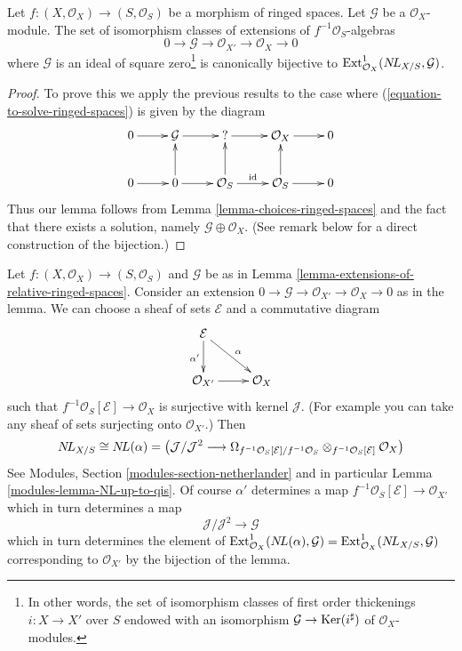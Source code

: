 \begin{lemma}
\label{lemma-extensions-of-relative-ringed-spaces}
Let $f : (X, \mathcal{O}_X) \to (S, \mathcal{O}_S)$ be a morphism of
ringed spaces. Let $\mathcal{G}$ be a $\mathcal{O}_X$-module.
The set of isomorphism classes of extensions of
$f^{-1}\mathcal{O}_S$-algebras
$$
0 \to \mathcal{G} \to \mathcal{O}_{X'} \to \mathcal{O}_X \to 0
$$
where $\mathcal{G}$ is an ideal of square zero\footnote{In other words,
the set of isomorphism classes of first order thickenings
$i : X \to X'$ over $S$ endowed with an isomorphism
$\mathcal{G} \to \mathop{\mathrm{Ker}}(i^\sharp)$ of $\mathcal{O}_X$-modules.} 
is canonically bijective to
$\mathop{\mathrm{Ext}}\nolimits^1_{\mathcal{O}_X}(\mathop{N\!L}\nolimits_{X/S}, \mathcal{G})$.
\end{lemma}

\begin{proof}
To prove this we apply the previous results to the case where
(\ref{equation-to-solve-ringed-spaces}) is given by the diagram
$$
\xymatrix{
0 \ar[r] &
\mathcal{G} \ar[r] &
{?} \ar[r] &
\mathcal{O}_X \ar[r] & 0 \\
0 \ar[r] &
0 \ar[u] \ar[r] &
\mathcal{O}_S \ar[u] \ar[r]^{\text{id}} &
\mathcal{O}_S \ar[u] \ar[r] & 0
}
$$
Thus our lemma follows from Lemma \ref{lemma-choices-ringed-spaces}
and the fact that there exists a solution, namely
$\mathcal{G} \oplus \mathcal{O}_X$.
(See remark below for a direct construction of the bijection.)
\end{proof}

\begin{remark}
\label{remark-extensions-of-relative-ringed-spaces}
Let $f : (X, \mathcal{O}_X) \to (S, \mathcal{O}_S)$ and $\mathcal{G}$
be as in Lemma \ref{lemma-extensions-of-relative-ringed-spaces}.
Consider an extension
$0 \to \mathcal{G} \to \mathcal{O}_{X'} \to \mathcal{O}_X \to 0$
as in the lemma. We can choose a sheaf of sets $\mathcal{E}$
and a commutative diagram
$$
\xymatrix{
\mathcal{E} \ar[d]_{\alpha'} \ar[rd]^\alpha \\
\mathcal{O}_{X'} \ar[r] & \mathcal{O}_X
}
$$
such that $f^{-1}\mathcal{O}_S[\mathcal{E}] \to \mathcal{O}_X$
is surjective with kernel $\mathcal{J}$.
(For example you can take any sheaf of sets surjecting
onto $\mathcal{O}_{X'}$.) Then
$$
\mathop{N\!L}\nolimits_{X/S} \cong \mathop{N\!L}\nolimits(\alpha) = 
\left(
\mathcal{J}/\mathcal{J}^2
\longrightarrow
\Omega_{f^{-1}\mathcal{O}_S[\mathcal{E}]/f^{-1}\mathcal{O}_S}
\otimes_{f^{-1}\mathcal{O}_S[\mathcal{E}]} \mathcal{O}_X\right)
$$
See Modules, Section \ref{modules-section-netherlander} and in particular
Lemma \ref{modules-lemma-NL-up-to-qis}. Of course $\alpha'$ determines a map
$f^{-1}\mathcal{O}_S[\mathcal{E}] \to \mathcal{O}_{X'}$
which in turn determines a map
$$
\mathcal{J}/\mathcal{J}^2 \longrightarrow \mathcal{G}
$$
which in turn determines the element of
$\mathop{\mathrm{Ext}}\nolimits^1_{\mathcal{O}_X}(\mathop{N\!L}\nolimits(\alpha), \mathcal{G}) =
\mathop{\mathrm{Ext}}\nolimits^1_{\mathcal{O}_X}(\mathop{N\!L}\nolimits_{X/S}, \mathcal{G})$
corresponding to $\mathcal{O}_{X'}$ by the bijection of the lemma.
\end{remark}

